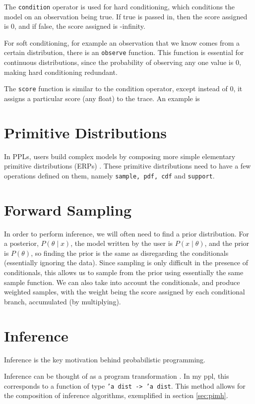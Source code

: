 The \texttt{condition} operator is used for hard conditioning, which conditions the model on an observation being true. If true is passed in, then the score assigned is 0, and if false, the score assigned is -infinity.

For soft conditioning, for example an observation that we know comes from a certain distribution, there is an \texttt{observe} function. This function is essential for continuous distributions, since the probability of observing any one value is 0, making hard conditioning redundant.

The \texttt{score} function is similar to the condition operator, except instead of 0, it assigns a particular score (any float) to the trace. An example is %

\section{Primitive Distributions}
In PPLs, users build complex models by composing more simple elementary primitive distributions (ERPs) \cite{pmlr-v15-wingate11a}. These primitive distributions need to have a few operations defined on them, namely \texttt{sample, pdf, cdf} and \texttt{support}.

\section{Forward Sampling}
In order to perform inference, we will often need to find a prior distribution. For a posterior, $P(\theta\mid x)$, the model written by the user is $P(x\mid\theta)$, and the prior is $P(\theta)$, so finding the prior is the same as disregarding the conditionals (essentially ignoring the data). Since sampling is only difficult in the presence of conditionals, this allows us to sample from the prior using essentially the same sample function. We can also take into account the conditionals, and produce weighted samples, with the weight being the score assigned by each conditional branch, accumulated (by multiplying).

\section{Inference}

Inference is the key motivation behind probabilistic programming. 

Inference can be thought of as a program transformation \cite{scibior2015practical} \cite{Zinkov2016ComposingIA}. In my ppl, this corresponds to a function of type \texttt{'a dist -> 'a dist}. This method allows for the composition of inference algorithms, exemplified in section \ref{sec:pimh}.

